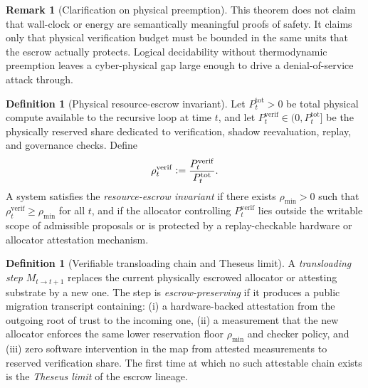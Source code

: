 \documentclass[11pt]{article}
\theoremstyle{definition}
\newtheorem{definition}[theorem]{Definition}
\newtheorem{remark}[theorem]{Remark}
\newcommand{\1}{\mathbf{1}}
\newcommand{\Defeq}{\vcentcolon=}
\begin{document}
\begin{remark}[Clarification on physical preemption]
This theorem does not claim that wall-clock or energy are semantically meaningful proofs of safety. It claims only that physical verification budget must be bounded in the same units that the escrow actually protects. Logical decidability without thermodynamic preemption leaves a cyber-physical gap large enough to drive a denial-of-service attack through.
\end{remark}


\begin{definition}[Physical resource-escrow invariant]\label{def:resource_escrow}
Let $P_t^{\mathrm{tot}}>0$ be total physical compute available to the recursive loop at time $t$, and let $P_t^{\mathrm{verif}}\in(0,P_t^{\mathrm{tot}}]$ be the physically reserved share dedicated to verification, shadow reevaluation, replay, and governance checks. Define
\[
\rho_t^{\mathrm{verif}}\Defeq \frac{P_t^{\mathrm{verif}}}{P_t^{\mathrm{tot}}}.
\]
A system satisfies the \emph{resource-escrow invariant} if there exists $\rho_{\min}>0$ such that $\rho_t^{\mathrm{verif}}\ge \rho_{\min}$ for all $t$, and if the allocator controlling $P_t^{\mathrm{verif}}$ lies outside the writable scope of admissible proposals or is protected by a replay-checkable hardware or allocator attestation mechanism.
\end{definition}

\begin{definition}[Verifiable transloading chain and Theseus limit]\label{def:transloading}
A \emph{transloading step} $M_{t\to t+1}$ replaces the current physically escrowed allocator or attesting substrate by a new one. The step is \emph{escrow-preserving} if it produces a public migration transcript containing: (i) a hardware-backed attestation from the outgoing root of trust to the incoming one, (ii) a measurement that the new allocator enforces the same lower reservation floor $\rho_{\min}$ and checker policy, and (iii) zero software intervention in the map from attested measurements to reserved verification share. The first time at which no such attestable chain exists is the \emph{Theseus limit} of the escrow lineage.
\end{definition}
\end{document}
